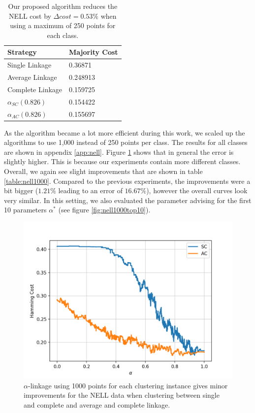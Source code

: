 \begin{table}[h]
    \centering
    \begin{tabular}{|l | l|}
    \hline
    Strategy & Majority Cost\\ \hline
    Single Linkage & 0.36871\\
    Average Linkage & 0.248913\\
    Complete Linkage & 0.159725\\
    $\alpha_{SC}(0.826)$ & 0.154422\\
    $\alpha_{AC}(0.826)$ & 0.155697\\\hline
    \end{tabular}
    \caption{Our proposed algorithm reduces the NELL cost by $\Delta cost = 0.53\%$ when using a maximum of 250 points for each class.}
    \label{table:nellresults}
\end{table}

As the algorithm became a lot more efficient during this work, we scaled up the algorithms to use 1,000 instead of 250 points per class. The results for all classes are shown in appendix \ref{app:nell}. Figure \ref{fig:nellresults1000} shows that in general the error is slightly higher. This is because our experiments contain more different classes. Overall, we again see slight improvements that are shown in table \ref{table:nell1000}. Compared to the previous experiments, the improvements were a bit bigger ($1.21\%$ leading to an error of $16.67\%$), however the overall curves look very similar. In this setting, we also evaluated the parameter advising for the first 10 parameters $\alpha^*$ (see figure \ref{fig:nell1000top10}).

\begin{figure}[h]
\centering
  \includegraphics[width=.5\linewidth]{plots/nell_1000}
\caption{$\alpha$-linkage using 1000 points for each clustering instance gives minor improvements for the NELL data when clustering between single and complete and average and complete linkage.}
\label{fig:nellresults1000}
\end{figure}

